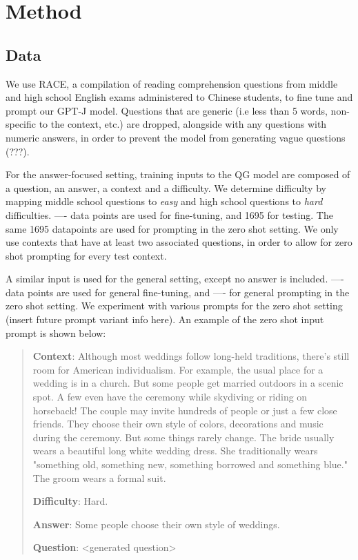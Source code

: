 \documentclass[11pt]{article}
\begin{document}
\section{Method}

\subsection{Data}

We use RACE, a compilation of reading comprehension questions from middle and high school English exams administered to Chinese students, to fine tune and prompt our GPT-J model. Questions that are generic (i.e less than 5 words, non-specific to the context, etc.) are dropped, alongside with any questions with numeric answers, in order to prevent the model from generating vague questions (???). 

For the answer-focused setting, training inputs to the QG model are composed of a question, an answer, a context and a difficulty. We determine difficulty by mapping middle school questions to \textit{easy} and high school questions to \textit{hard} difficulties.   ---- data points are used for fine-tuning, and 1695 for testing. The same 1695 datapoints are used for prompting in the zero shot setting. We only use contexts that have at least two associated questions, in order to allow for zero shot prompting for every test context.  

A similar input is used for the general setting, except no answer is included.  ---- data points are used for general fine-tuning, and ---- for general prompting in the zero shot setting. We experiment with various prompts for the zero shot setting (insert future prompt variant info here). An example of the zero shot input prompt is shown below: 

\begin{quote}
\textbf{Context}: Although most weddings follow long-held traditions, there's still room for American individualism. For example, the usual place for a wedding is in a church. But some people get married outdoors in a scenic spot. A few even have the ceremony while skydiving or riding on horseback! The couple may invite hundreds of people or just a few close friends. They choose their own style of colors, decorations and music during the ceremony. But some things rarely change. The bride usually wears a beautiful long white wedding dress. She traditionally wears "something old, something new, something borrowed and something blue." The groom wears a formal suit.

\textbf{Difficulty}: Hard. 

\textbf{Answer}: Some people choose their own style of weddings. 

\textbf{Question}: <generated question>

\end{quote}
\end{document}

